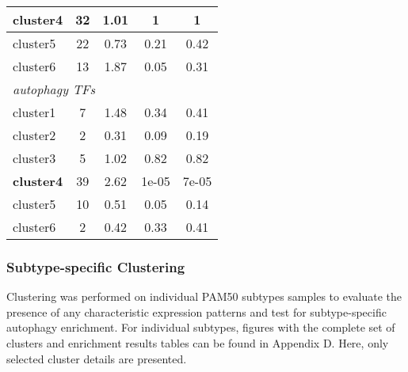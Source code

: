 \begin{table}[!h]
\begin{tabular}{lcccc}
            \multicolumn{1}{l|}{cluster4} & \multicolumn{1}{c|}{32} & \multicolumn{1}{c|}{1.01} & \multicolumn{1}{c|}{1} & 1 \\ \hline
            \multicolumn{1}{l|}{cluster5} & \multicolumn{1}{c|}{22} & \multicolumn{1}{c|}{0.73} & \multicolumn{1}{c|}{0.21} & 0.42 \\ \hline
            \multicolumn{1}{l|}{cluster6} & \multicolumn{1}{c|}{13} & \multicolumn{1}{c|}{1.87} & \multicolumn{1}{c|}{0.05} & 0.31 \\ \hline
            \multicolumn{5}{l}{\textit{autophagy TFs}} \\ \hline
            \multicolumn{1}{l|}{cluster1} & \multicolumn{1}{c|}{7} & \multicolumn{1}{c|}{1.48} & \multicolumn{1}{c|}{0.34} & 0.41 \\ \hline
            \multicolumn{1}{l|}{cluster2} & \multicolumn{1}{c|}{2} & \multicolumn{1}{c|}{0.31} & \multicolumn{1}{c|}{0.09} & 0.19 \\ \hline
            \multicolumn{1}{l|}{cluster3} & \multicolumn{1}{c|}{5} & \multicolumn{1}{c|}{1.02} & \multicolumn{1}{c|}{0.82} & 0.82 \\ \hline
            \multicolumn{1}{l|}{\textbf{cluster4}} & \multicolumn{1}{c|}{39} & \multicolumn{1}{c|}{2.62} & \multicolumn{1}{c|}{1e-05} & 7e-05 \\ \hline
            \multicolumn{1}{l|}{cluster5} & \multicolumn{1}{c|}{10} & \multicolumn{1}{c|}{0.51} & \multicolumn{1}{c|}{0.05} & 0.14 \\ \hline
            \multicolumn{1}{l|}{cluster6} & \multicolumn{1}{c|}{2} & \multicolumn{1}{c|}{0.42} & \multicolumn{1}{c|}{0.33} & 0.41 \\ \hline
            \end{tabular}
            \end{table}
        
     
        \newpage
        \subsubsection{Subtype-specific Clustering}
        
        Clustering was performed on individual PAM50 subtypes samples to evaluate the presence of any characteristic expression patterns and test for subtype-specific autophagy enrichment. 
        For individual subtypes, figures with the complete set of clusters and enrichment results tables can be found in Appendix D. Here, only selected cluster details are presented. 
        
